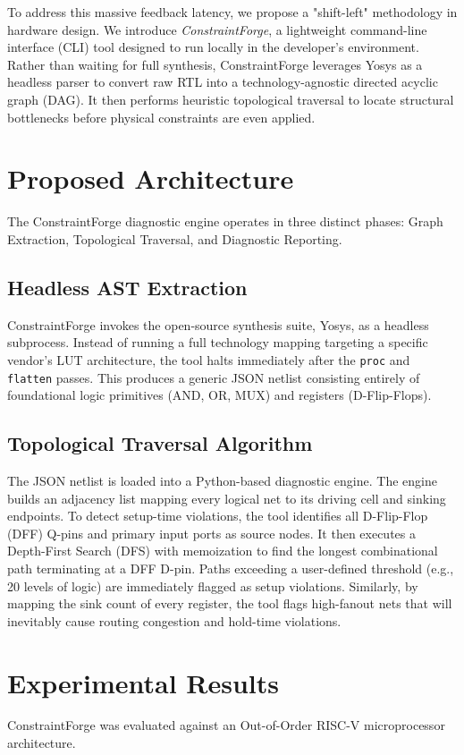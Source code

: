 \documentclass[conference]{IEEEtran}
\begin{document}
To address this massive feedback latency, we propose a "shift-left" methodology in hardware design. We introduce \textit{ConstraintForge}, a lightweight command-line interface (CLI) tool designed to run locally in the developer's environment. Rather than waiting for full synthesis, ConstraintForge leverages Yosys as a headless parser to convert raw RTL into a technology-agnostic directed acyclic graph (DAG). It then performs heuristic topological traversal to locate structural bottlenecks before physical constraints are even applied.

\section{Proposed Architecture}
The ConstraintForge diagnostic engine operates in three distinct phases: Graph Extraction, Topological Traversal, and Diagnostic Reporting.

\subsection{Headless AST Extraction}
ConstraintForge invokes the open-source synthesis suite, Yosys, as a headless subprocess. Instead of running a full technology mapping targeting a specific vendor's LUT architecture, the tool halts immediately after the \texttt{proc} and \texttt{flatten} passes. This produces a generic JSON netlist consisting entirely of foundational logic primitives (AND, OR, MUX) and registers (D-Flip-Flops).

\subsection{Topological Traversal Algorithm}
The JSON netlist is loaded into a Python-based diagnostic engine. The engine builds an adjacency list mapping every logical net to its driving cell and sinking endpoints. To detect setup-time violations, the tool identifies all D-Flip-Flop (DFF) Q-pins and primary input ports as source nodes. It then executes a Depth-First Search (DFS) with memoization to find the longest combinational path terminating at a DFF D-pin. 
Paths exceeding a user-defined threshold (e.g., 20 levels of logic) are immediately flagged as setup violations. Similarly, by mapping the sink count of every register, the tool flags high-fanout nets that will inevitably cause routing congestion and hold-time violations.

\section{Experimental Results}
ConstraintForge was evaluated against an Out-of-Order RISC-V microprocessor architecture. 
\end{document}
